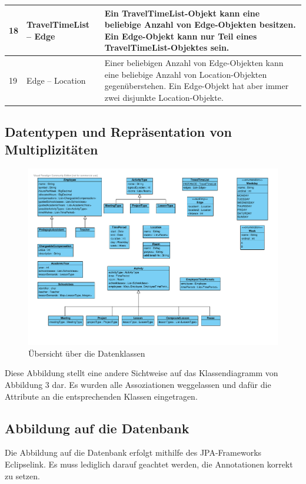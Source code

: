 \documentclass[fontsize=12pt,paper=a4,twoside]{scrartcl}
\begin{document}
\begin{tabularx}{\textwidth}{|p{0.6cm}|p{5cm}|X|}
\hline
18 	& TravelTimeList -- Edge 					& Ein TravelTimeList-Objekt kann eine beliebige
	Anzahl von Edge-Objekten besitzen. Ein Edge-Objekt kann nur Teil eines TravelTimeList-Objektes sein. \\\hline
19	& Edge -- Location							& Einer beliebigen Anzahl von Edge-Objekten kann 
	eine beliebige Anzahl von Location-Objekten gegenüberstehen. Ein Edge-Objekt hat aber immer zwei disjunkte Location-Objekte.\\\hline 
\end{tabularx}
\subsection{Datentypen und Repräsentation von Multiplizitäten}
\begin{figure}[H]
\includegraphics[width=\textwidth]{Datensicht.pdf}
\caption{Übersicht über die Datenklassen}
\end{figure}

Diese Abbildung stellt eine andere Sichtweise auf das Klassendiagramm von Abbildung 3 dar. Es wurden alle Assoziationen weggelassen und dafür die Attribute an die entsprechenden Klassen eingetragen.

\subsection{Abbildung auf die Datenbank}
Die Abbildung auf die Datenbank erfolgt mithilfe des JPA-Frameworks Eclipselink. Es muss lediglich darauf geachtet werden, die Annotationen korrekt zu setzen.  
\end{document}

